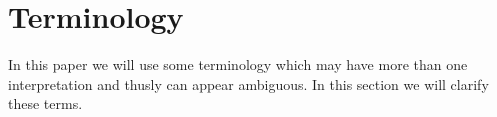 \section{Terminology}
In this paper we will use some terminology which may have more than one interpretation and thusly can appear ambiguous.
In this section we will clarify these terms.
